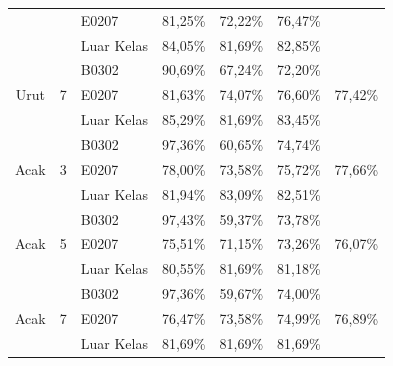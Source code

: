 \begin{enumerate}
\begin{table}[H]
\begin{tabular}{|c|c|l|c|c|c|c|}
			                            &                    & E0207                            & 81,25\%   & 72,22\% & 76,47\%   &                          \\ \cline{3-6}
			                            &                    & Luar Kelas                       & 84,05\%   & 81,69\% & 82,85\%   &                          \\ \hline
			      \multirow{3}{*}{Urut} & \multirow{3}{*}{7} & B0302                            & 90,69\%   & 67,24\% & 72,20\%   & \multirow{3}{*}{77,42\%} \\ \cline{3-6}
			                            &                    & E0207                            & 81,63\%   & 74,07\% & 76,60\%   &                          \\ \cline{3-6}
			                            &                    & Luar Kelas                       & 85,29\%   & 81,69\% & 83,45\%   &                          \\ \hline
			      \multirow{3}{*}{Acak} & \multirow{3}{*}{3} & B0302                            & 97,36\%   & 60,65\% & 74,74\%   & \multirow{3}{*}{77,66\%} \\ \cline{3-6}
			                            &                    & E0207                            & 78,00\%   & 73,58\% & 75,72\%   &                          \\ \cline{3-6}
			                            &                    & Luar Kelas                       & 81,94\%   & 83,09\% & 82,51\%   &                          \\ \hline
			      \multirow{3}{*}{Acak} & \multirow{3}{*}{5} & B0302                            & 97,43\%   & 59,37\% & 73,78\%   & \multirow{3}{*}{76,07\%} \\ \cline{3-6}
			                            &                    & E0207                            & 75,51\%   & 71,15\% & 73,26\%   &                          \\ \cline{3-6}
			                            &                    & Luar Kelas                       & 80,55\%   & 81,69\% & 81,18\%   &                          \\ \hline
			      \multirow{3}{*}{Acak} & \multirow{3}{*}{7} & B0302                            & 97,36\%   & 59,67\% & 74,00\%   & \multirow{3}{*}{76,89\%} \\ \cline{3-6}
			                            &                    & E0207                            & 76,47\%   & 73,58\% & 74,99\%   &                          \\ \cline{3-6}
			                            &                    & Luar Kelas                       & 81,69\%   & 81,69\% & 81,69\%   &                          \\ \hline
		      \end{tabular}
	      \end{table}



\end{enumerate}
